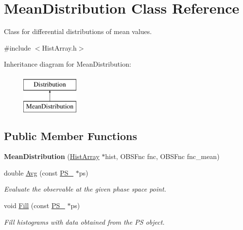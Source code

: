\hypertarget{classMeanDistribution}{}\section{Mean\+Distribution Class Reference}
\label{classMeanDistribution}


Class for differential distributions of mean values.  




{\ttfamily \#include $<$Hist\+Array.\+h$>$}

Inheritance diagram for Mean\+Distribution\+:\begin{figure}[H]
\begin{center}
\leavevmode
\includegraphics[height=2.000000cm]{classMeanDistribution}
\end{center}
\end{figure}
\subsection*{Public Member Functions}
\begin{DoxyCompactItemize}
\item 
\hypertarget{classMeanDistribution_a4cf60c5fcc4da56771b9e62395c89b2f}{}{\bfseries Mean\+Distribution} (\hyperlink{classHistArray}{Hist\+Array} $\ast$hist, O\+B\+S\+Fnc fnc, O\+B\+S\+Fnc fnc\+\_\+mean)\label{classMeanDistribution_a4cf60c5fcc4da56771b9e62395c89b2f}

\item 
double \hyperlink{classMeanDistribution_ad4b5ab2430e53e5f19c7819d1ae52e02}{Avg} (const \hyperlink{classPS__2}{P\+S\+\_} $\ast$ps)
\begin{DoxyCompactList}\small\item\em Evaluate the observable at the given phase space point. \end{DoxyCompactList}\item 
void \hyperlink{classMeanDistribution_a46b191391f291a6a2b169e52fdf06c23}{Fill} (const \hyperlink{classPS__2}{P\+S\+\_} $\ast$ps)
\begin{DoxyCompactList}\small\item\em Fill histograms with data obtained from the P\+S object. \end{DoxyCompactList}\end{DoxyCompactItemize}


